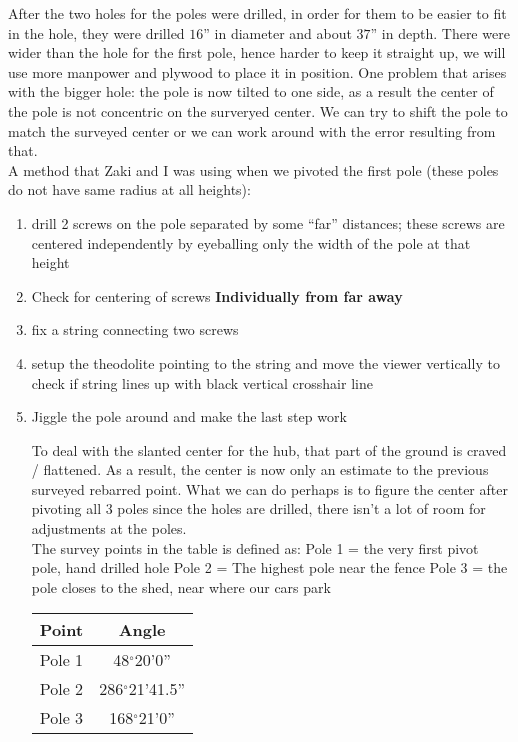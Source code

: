 \documentclass[12pt, letter]{article}
\begin{document}
After the two holes for the poles were drilled, in order for them to be easier to fit in the hole, they were drilled $16$'' in diameter and about $37$'' in depth. There were wider than the hole for the first pole, hence harder to keep it straight up, we will use more manpower and plywood to place it in position. One problem that arises with the bigger hole: the pole is now tilted to one side, as a result the center of the pole is not concentric on the surveryed center. We can try to shift the pole to match the surveyed center or we can work around with the error resulting from that.\\

A method that Zaki and I was using when we pivoted the first pole (these poles do not have same radius at all heights):
\begin{enumerate}
\item{drill 2 screws on the pole separated by some ``far'' distances; these screws are centered independently by eyeballing only the width of the pole at that height}
\item{Check for centering of screws \bf{Individually} from far away }
\item{fix a string connecting two screws}
\item{setup the theodolite pointing to the string and move the viewer vertically to check if string lines up with black vertical crosshair line}
\item{Jiggle the pole around and make the last step work}

To deal with the slanted center for the hub, that part of the ground is craved / flattened. As a result, the center is now only an estimate to the previous surveyed rebarred point. What we can do perhaps is to figure the center after pivoting all 3 poles since the holes are drilled, there isn't a lot of room for adjustments at the poles. \\


The survey points in the table is defined as:
Pole 1 = the very first pivot pole, hand drilled hole
Pole 2 = The highest pole near the fence
Pole 3 = the pole closes to the shed, near where our cars park \\ 
 

\begin{table}[!h]
\centering
\begin{tabular}{|c|c|} \hline

Point & Angle  \\ \hline
Pole 1 & 48$^\circ$20'0'' \\ \hline
Pole 2 & 286$^\circ$21'41.5'' \\ \hline
Pole 3 & 168$^\circ$21'0'' \\ \hline



\end{tabular}
\end{table}
\end{enumerate}
\end{document}
